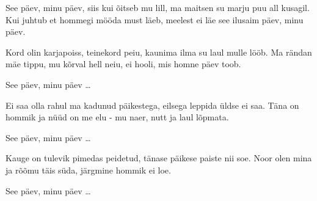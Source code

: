 See p\"aev, minu p\"aev, siis kui \~oitseb mu lill,
ma maitsen su marju puu all kusagil.
Kui juhtub et hommegi m\"o\"oda must l\"aeb,
meelest ei l\"ae see ilusaim p\"aev, minu p\"aev.

Kord olin karjapoiss, teinekord peiu,
kaunima ilma su laul mulle l\"o\"ob.
Ma r\"andan m\"ae tippu, mu k\~orval hell neiu,
ei hooli, mis homne p\"aev toob.

See p\"aev, minu p\"aev \ldots

Ei saa olla rahul ma kadunud p\"aikestega,
eilsega leppida \"uldse ei saa.
T\"ana on hommik ja n\"u\"ud on me elu -
mu naer, nutt ja laul l\~opmata.

See p\"aev, minu p\"aev \ldots

Kauge on tulevik pimedas peidetud,
t\"anase p\"aikese paiste nii soe.
Noor olen mina ja r\~o\~omu t\"ais s\"uda,
j\"argmine hommik ei loe.

See p\"aev, minu p\"aev \ldots